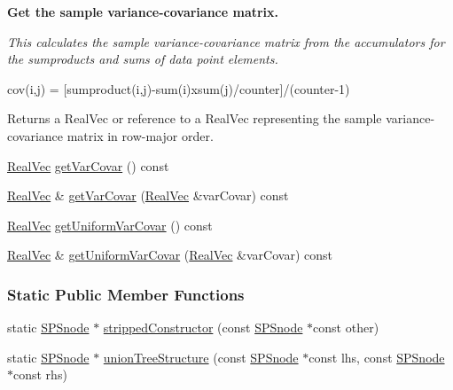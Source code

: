 \begin{Indent}{\bf \-Get the sample variance-\/covariance matrix.}\par
{\em \-This calculates the sample variance-\/covariance matrix from the accumulators for the sumproducts and sums of data point elements.

cov(i,j) = \mbox{[}sumproduct(i,j)-\/sum(i)xsum(j)/counter\mbox{]}/(counter-\/1)

\begin{DoxyReturn}{\-Returns}
a \-Real\-Vec or reference to a \-Real\-Vec representing the sample variance-\/covariance matrix in row-\/major order. 
\end{DoxyReturn}
}\begin{DoxyCompactItemize}
\item 
\hyperlink{namespacesubpavings_af2d57bb6e12f4a73169f2e496d6a641f}{\-Real\-Vec} \hyperlink{classsubpavings_1_1SPSnode_a7637c85b772a280a9769b97f7bace3c3}{get\-Var\-Covar} () const 
\item 
\hyperlink{namespacesubpavings_af2d57bb6e12f4a73169f2e496d6a641f}{\-Real\-Vec} \& \hyperlink{classsubpavings_1_1SPSnode_a1bc0843e834ae4d09db3bc148b64761b}{get\-Var\-Covar} (\hyperlink{namespacesubpavings_af2d57bb6e12f4a73169f2e496d6a641f}{\-Real\-Vec} \&var\-Covar) const 
\item 
\hyperlink{namespacesubpavings_af2d57bb6e12f4a73169f2e496d6a641f}{\-Real\-Vec} \hyperlink{classsubpavings_1_1SPSnode_a83c7f66b07ab9afd1934b080fd4af8c4}{get\-Uniform\-Var\-Covar} () const 
\item 
\hyperlink{namespacesubpavings_af2d57bb6e12f4a73169f2e496d6a641f}{\-Real\-Vec} \& \hyperlink{classsubpavings_1_1SPSnode_a8ca1683e838159d5a33048344bec9b49}{get\-Uniform\-Var\-Covar} (\hyperlink{namespacesubpavings_af2d57bb6e12f4a73169f2e496d6a641f}{\-Real\-Vec} \&var\-Covar) const 
\end{DoxyCompactItemize}
\end{Indent}
\subsubsection*{\-Static \-Public \-Member \-Functions}
\begin{DoxyCompactItemize}
\item 
static \hyperlink{classsubpavings_1_1SPSnode}{\-S\-P\-Snode} $\ast$ \hyperlink{classsubpavings_1_1SPSnode_ac6259d2964d38acbb759c9f212853ef7}{stripped\-Constructor} (const \hyperlink{classsubpavings_1_1SPSnode}{\-S\-P\-Snode} $\ast$const other)
\item 
static \hyperlink{classsubpavings_1_1SPSnode}{\-S\-P\-Snode} $\ast$ \hyperlink{classsubpavings_1_1SPSnode_a2dfb3087cff36fdf558bf75d5ee039c9}{union\-Tree\-Structure} (const \hyperlink{classsubpavings_1_1SPSnode}{\-S\-P\-Snode} $\ast$const lhs, const \hyperlink{classsubpavings_1_1SPSnode}{\-S\-P\-Snode} $\ast$const rhs)
\end{DoxyCompactItemize}
